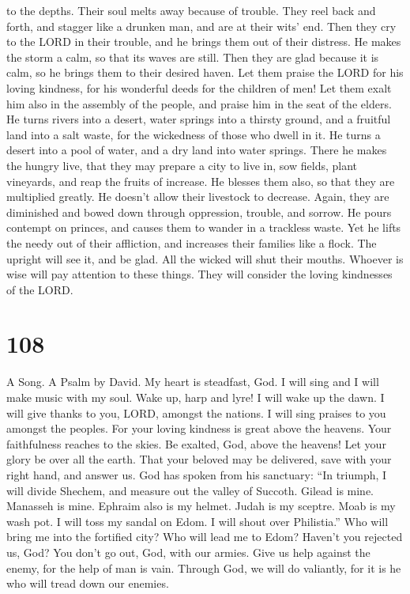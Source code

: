 to the depths. Their soul melts away because of trouble. 
They reel back and forth, and stagger like a drunken man, and are at
their wits' end.  Then they cry to the LORD in their
trouble, and he brings them out of their distress.  He
makes the storm a calm, so that its waves are still.  Then
they are glad because it is calm, so he brings them to their desired
haven.  Let them praise the LORD for his loving kindness,
for his wonderful deeds for the children of men!  Let them
exalt him also in the assembly of the people, and praise him in the seat
of the elders.  He turns rivers into a desert, water
springs into a thirsty ground,  and a fruitful land into a
salt waste, for the wickedness of those who dwell in it. 
He turns a desert into a pool of water, and a dry land into water
springs.  There he makes the hungry live, that they may
prepare a city to live in,  sow fields, plant vineyards,
and reap the fruits of increase.  He blesses them also, so
that they are multiplied greatly. He doesn't allow their livestock to
decrease.  Again, they are diminished and bowed down
through oppression, trouble, and sorrow.  He pours contempt
on princes, and causes them to wander in a trackless waste.
 Yet he lifts the needy out of their affliction, and
increases their families like a flock.  The upright will
see it, and be glad. All the wicked will shut their mouths.
 Whoever is wise will pay attention to these things. They
will consider the loving kindnesses of the LORD.

\hypertarget{section-100}{%
\section{108}\label{section-100}}

A Song. A Psalm by David.  My heart is steadfast, God. I
will sing and I will make music with my soul.  Wake up, harp
and lyre! I will wake up the dawn.  I will give thanks to
you, LORD, amongst the nations. I will sing praises to you amongst the
peoples.  For your loving kindness is great above the
heavens. Your faithfulness reaches to the skies.  Be
exalted, God, above the heavens! Let your glory be over all the earth.
 That your beloved may be delivered, save with your right
hand, and answer us.  God has spoken from his sanctuary:
``In triumph, I will divide Shechem, and measure out the valley of
Succoth.  Gilead is mine. Manasseh is mine. Ephraim also is
my helmet. Judah is my sceptre.  Moab is my wash pot. I will
toss my sandal on Edom. I will shout over Philistia.''  Who
will bring me into the fortified city? Who will lead me to Edom?
 Haven't you rejected us, God? You don't go out, God, with
our armies.  Give us help against the enemy, for the help
of man is vain.  Through God, we will do valiantly, for it
is he who will tread down our enemies.

